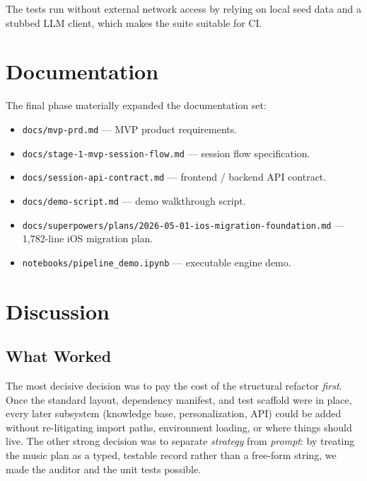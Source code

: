 \documentclass[11pt,a4paper]{article}
\begin{document}
The tests run without external network access by relying on local seed data
and a stubbed LLM client, which makes the suite suitable for CI.

\section{Documentation}

The final phase materially expanded the documentation set:

\begin{itemize}[leftmargin=*]
  \item \texttt{docs/mvp-prd.md} --- MVP product requirements.
  \item \texttt{docs/stage-1-mvp-session-flow.md} --- session flow specification.
  \item \texttt{docs/session-api-contract.md} --- frontend / backend API contract.
  \item \texttt{docs/demo-script.md} --- demo walkthrough script.
  \item \texttt{docs/superpowers/plans/2026-05-01-ios-migration-foundation.md} ---
        1{,}782-line iOS migration plan.
  \item \texttt{notebooks/pipeline\_demo.ipynb} --- executable engine demo.
\end{itemize}

\section{Discussion}

\subsection{What Worked}

The most decisive decision was to pay the cost of the structural refactor
\emph{first}. Once the standard layout, dependency manifest, and test scaffold
were in place, every later subsystem (knowledge base, personalization, API)
could be added without re-litigating import paths, environment loading, or
where things should live. The other strong decision was to separate
\emph{strategy} from \emph{prompt}: by treating the music plan as a typed,
testable record rather than a free-form string, we made the auditor and the
unit tests possible.
\end{document}
